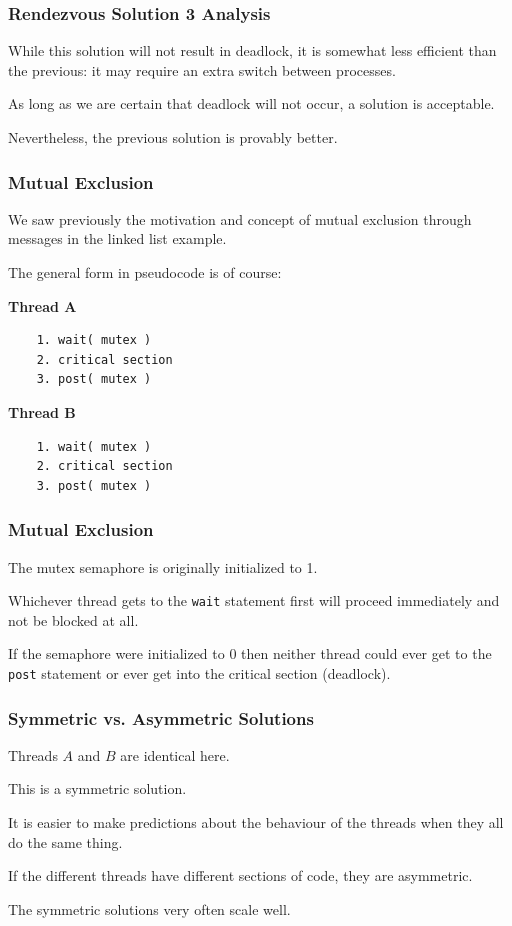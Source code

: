 \begin{frame}
\frametitle{Rendezvous Solution 3 Analysis}

While this solution will not result in deadlock, it is somewhat less efficient than the previous: it may require an extra switch between processes.

As long as we are certain that deadlock will not occur, a solution is acceptable. 

Nevertheless, the previous solution is provably better.



\end{frame}

\begin{frame}[fragile]
\frametitle{Mutual Exclusion}

We saw previously the motivation and concept of mutual exclusion through messages in the linked list example. 

The general form in pseudocode is of course:

\begin{multicols}{2}
\textbf{Thread A}
  \begin{verbatim}
	1. wait( mutex )
	2. critical section
	3. post( mutex )
  \end{verbatim}
\columnbreak
\textbf{Thread B}
  \begin{verbatim}
	1. wait( mutex )
	2. critical section
	3. post( mutex )
  \end{verbatim}
\end{multicols}
\vspace{-2em}


\end{frame}

\begin{frame}
\frametitle{Mutual Exclusion}

The mutex semaphore is originally initialized to 1.

Whichever thread gets to the \texttt{wait} statement first will proceed immediately and not be blocked at all. 

If the semaphore were initialized to 0 then neither thread could ever get to the \texttt{post} statement or ever get into the critical section (deadlock).


\end{frame}

\begin{frame}
\frametitle{Symmetric vs. Asymmetric Solutions}

Threads $A$ and $B$ are identical here.

This is a \alert{symmetric} solution.

It is easier to make predictions about the behaviour of the threads when they all do the same thing. 

If the different threads have different sections of code, they are \alert{asymmetric}. 

The symmetric solutions very often scale well.


\end{frame}

